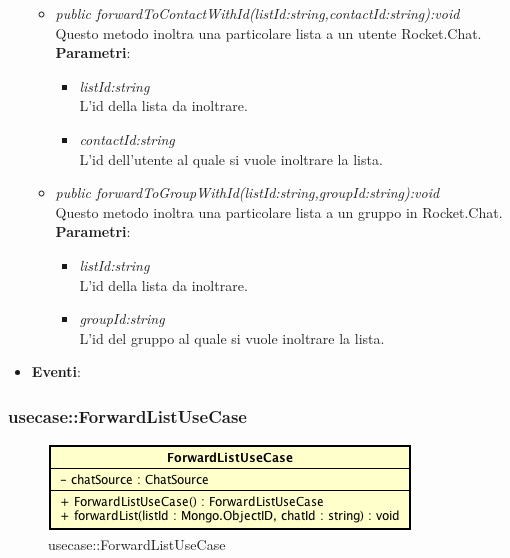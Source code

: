 \begin{itemize}
\begin{itemize}
	\item \textit{public forwardToContactWithId(listId:string,contactId:string):void}\\
	Questo metodo inoltra una particolare lista a un utente Rocket.Chat.
			\\ \textbf{Parametri}: \begin{itemize}
			\item \textit{listId:string}\\
			L'id della lista da inoltrare.
			\item \textit{contactId:string}\\
			L'id dell'utente al quale si vuole inoltrare la lista.
			\end{itemize} 
	\item \textit{public forwardToGroupWithId(listId:string,groupId:string):void}\\
	Questo metodo inoltra una particolare lista a un gruppo in Rocket.Chat.
			\\ \textbf{Parametri}: \begin{itemize}
			\item \textit{listId:string}\\
			L'id della lista da inoltrare.
			\item \textit{groupId:string}\\
			L'id del gruppo al quale si vuole inoltrare la lista.
			\end{itemize} 
	\end{itemize}
\item \textbf{Eventi}:
\end{itemize}

\subsubsection{usecase::ForwardListUseCase}

\label{usecase::ForwardListUseCase}
\begin{figure}[H]
	\centering
	\includegraphics[scale=0.5]{Sezioni/SottosezioniST/img/app/ForwardListUseCase.png}
	\caption{usecase::ForwardListUseCase}
\end{figure}

